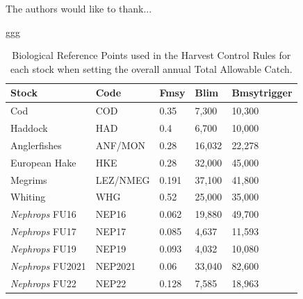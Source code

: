 \documentclass[12pt, halfline, a4paper]{ouparticle}
\begin{document}
\begin{notes}[Acknowledgements]
The authors would like to thank...
\end{notes}

\begin{thebibliography}
ggg
\end{thebibliography}

\newpage

\begin{table}
	\center
	\begin{tabular}{p{4cm} p{3cm} p{2cm} p{2cm} p{2cm}}
		\toprule
		Stock & Code & Fmsy & Blim & Bmsytrigger \\
		\hline
		Cod & COD & 0.35 & 7,300  & 10,300 \\
		Haddock & HAD & 0.4 & 6,700 & 10,000 \\
		Anglerfishes & ANF/MON & 0.28 & 16,032 & 22,278 \\
		European Hake & HKE & 0.28 & 32,000 & 45,000 \\
		Megrims & LEZ/NMEG & 0.191 & 37,100 & 41,800 \\
		Whiting & WHG & 0.52 & 25,000 & 35,000 \\
		\textit{Nephrops} FU16 & NEP16 & 0.062 & 19,880 & 49,700 \\
		\textit{Nephrops} FU17 & NEP17 & 0.085 & 4,637 & 11,593 \\
	        \textit{Nephrops} FU19 & NEP19 & 0.093 & 4,032 & 10,080 \\
		\textit{Nephrops} FU2021 & NEP2021 & 0.06 & 33,040 & 82,600 \\
		\textit{Nephrops} FU22 & NEP22 & 0.128 & 7,585 & 18,963 \\
		\bottomrule
	\end{tabular}
	\label{tab:brp}
	\caption{Biological Reference Points used in the Harvest Control Rules for each
		stock when setting the overall annual Total Allowable Catch.}
\end{table}

\newpage
\end{document}
